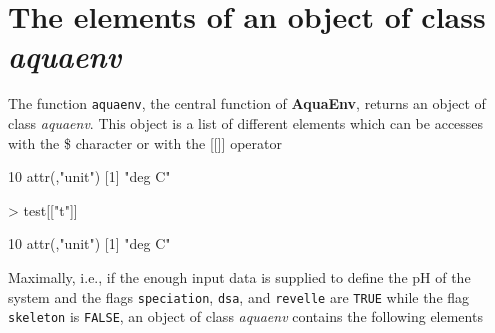 \documentclass[article,nojss]{jss}
\newcommand{\aq}{\textbf{\textsf{AquaEnv}}}
\begin{document}
\section{The elements of an object of class \textit{aquaenv}}
The function \texttt{aquaenv}, the central function of \aq$ $, returns an object of class \textit{aquaenv}. This object is a list of different elements which can be accesses with the \$ character or 
with the [[]] operator
\begin{Schunk}
\begin{Soutput}
[1] 10
attr(,"unit")
[1] "deg C"
\end{Soutput}
\begin{Sinput}
> test[["t"]]
\end{Sinput}
\begin{Soutput}
[1] 10
attr(,"unit")
[1] "deg C"
\end{Soutput}
\end{Schunk}
Maximally, i.e., if the enough input data is supplied to define the pH of the system and the flags \texttt{speciation}, \texttt{dsa}, and \texttt{revelle} are \texttt{TRUE} while the flag
\texttt{skeleton} is \texttt{FALSE}, an object of class \textit{aquaenv} contains the following elements
\end{document}
